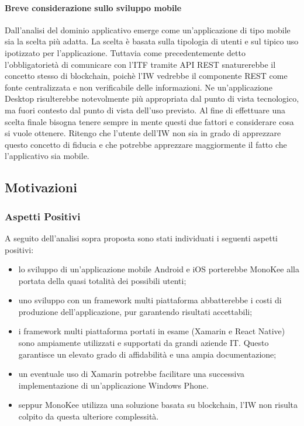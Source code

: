 \paragraph{Breve considerazione sullo sviluppo mobile}
Dall’analisi del dominio applicativo emerge come un’applicazione di tipo mobile sia la scelta più adatta. La scelta è basata sulla tipologia di utenti e sul tipico uso ipotizzato per l’applicazione. Tuttavia come precedentemente detto l’obbligatorietà di comunicare con l’ITF tramite API REST snaturerebbe il concetto stesso di blockchain, poichè l’IW vedrebbe il componente REST come fonte centralizzata e non verificabile delle informazioni. Ne un’applicazione Desktop risulterebbe notevolmente più appropriata dal punto di vista tecnologico, ma fuori contesto dal punto di vista dell’uso previsto.
Al fine di effettuare una scelta finale bisogna tenere sempre in mente questi due fattori e considerare cosa si vuole ottenere. Ritengo che l’utente dell’IW non sia in grado di apprezzare questo concetto di fiducia e che potrebbe apprezzare maggiormente il fatto che l’applicativo sia mobile.  
\subsection{Motivazioni}
\subsubsection{Aspetti Positivi}
A seguito dell’analisi sopra proposta sono stati individuati i seguenti aspetti positivi:
\begin{itemize} 
    \item lo sviluppo di un’applicazione mobile Android e iOS porterebbe MonoKee alla portata della quasi totalità dei possibili utenti;
    \item uno sviluppo con un framework multi piattaforma abbatterebbe i costi di produzione dell’applicazione, pur garantendo risultati accettabili;
    \item i framework multi piattaforma portati in esame (Xamarin e React Native) sono ampiamente utilizzati e supportati da grandi aziende IT. Questo garantisce un elevato grado di affidabilità e una ampia documentazione;
    \item un eventuale uso di Xamarin potrebbe facilitare una successiva implementazione di un’applicazione Windows Phone.
    \item seppur MonoKee utilizza una soluzione basata su blockchain, l’IW non risulta colpito da questa ulteriore complessità.
\end{itemize}
